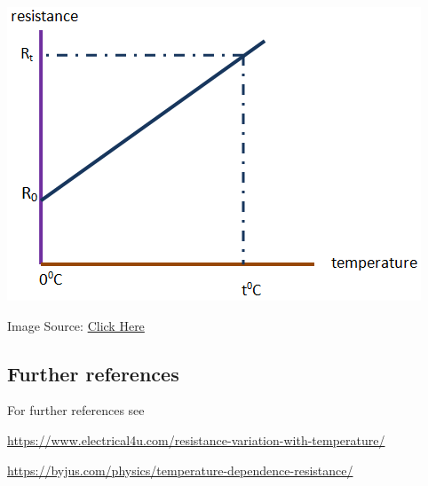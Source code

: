 \includegraphics[bb=0 0 200 150]{hee.PNG}


Image Source:
\href{https://electricstudents.blogspot.com/2017/06/effect-of-temperature-on-resistance-and.html}{Click Here}
    
\subsection{Further references}    

For further references see    


\url{https://www.electrical4u.com/resistance-variation-with-temperature/}
    
\url{https://byjus.com/physics/temperature-dependence-resistance/}
    

